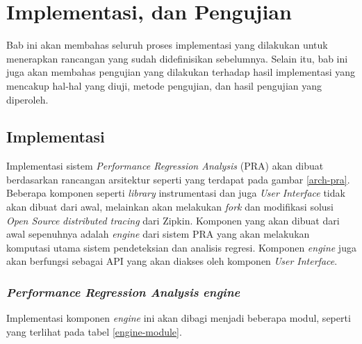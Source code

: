 \chapter{Implementasi, dan Pengujian}

Bab ini akan membahas seluruh proses implementasi yang dilakukan untuk menerapkan rancangan yang sudah didefinisikan sebelumnya. Selain itu, bab ini juga akan membahas pengujian yang dilakukan terhadap hasil implementasi yang mencakup hal-hal yang diuji, metode pengujian, dan hasil pengujian yang diperoleh. 


\section{Implementasi}
Implementasi sistem \textit{Performance Regression Analysis} (PRA) akan dibuat berdasarkan rancangan arsitektur seperti yang terdapat pada gambar \ref{arch-pra}. Beberapa komponen seperti \textit{library} instrumentasi dan juga \textit{User Interface} tidak akan dibuat dari awal, melainkan akan melakukan \textit{fork} dan modifikasi solusi \textit{Open Source} \textit{distributed tracing} dari Zipkin. Komponen yang akan dibuat dari awal sepenuhnya adalah \textit{engine} dari sistem PRA yang akan melakukan komputasi utama sistem pendeteksian dan analisis regresi. Komponen \textit{engine} juga akan berfungsi sebagai API yang akan diakses oleh komponen \textit{User Interface}.



\subsection{\textit{Performance Regression Analysis} \textit{engine}}
Implementasi komponen \textit{engine} ini akan dibagi menjadi beberapa modul, seperti yang terlihat pada tabel \ref{engine-module}.

